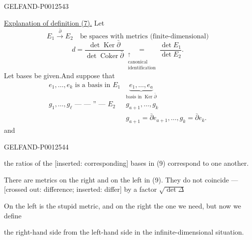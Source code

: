 \begin{GelfandAdjacentEvidence}{GELFAND-P001254}{3}


\underline{Explanation of definition (7).} Let
\begin{equation*}
E_1\xrightarrow{\bar\partial}E_2
\quad\text{be spaces with metrics (finite-dimensional)}\tag{8}
\end{equation*}
\begin{equation*}
d=\frac{\det\operatorname{Ker}\bar\partial}{\det\operatorname{Coker}\bar\partial}
\underset{\substack{\uparrow\\\text{canonical}\\\text{identification}}}{=}
\frac{\det E_1}{\det E_2}.\tag{9}
\end{equation*}
Let bases be given.\qquad And suppose that
\begin{equation*}
\begin{array}{l|l}
e_1,\ldots,e_k\text{ is a basis in }E_1&
\underbrace{e_1,\ldots,e_a}_{\text{basis in }\operatorname{Ker}\bar\partial}\\[2pt]
g_1,\ldots,g_{\ell}\text{ — — '' — }E_2&g_{a+1},\ldots,g_k\\
&g_{a+1}=\bar\partial e_{a+1},\ldots,g_k=\bar\partial e_k.
\end{array}\tag{10}
\end{equation*}
and
\end{GelfandAdjacentEvidence}
\begin{GelfandAdjacentEvidence}{GELFAND-P001254}{4}

the ratios of the [inserted: corresponding] bases in (9) correspond to one another.

There are metrics on the right and on the left in (9). They do not coincide — [crossed out: difference; inserted: differ] by a factor $\sqrt{\det\Delta}$

On the left is the stupid metric, and on the right the one we need, but now we define
\end{GelfandAdjacentEvidence}

the right-hand side from the left-hand side in the infinite-dimensional situation.


